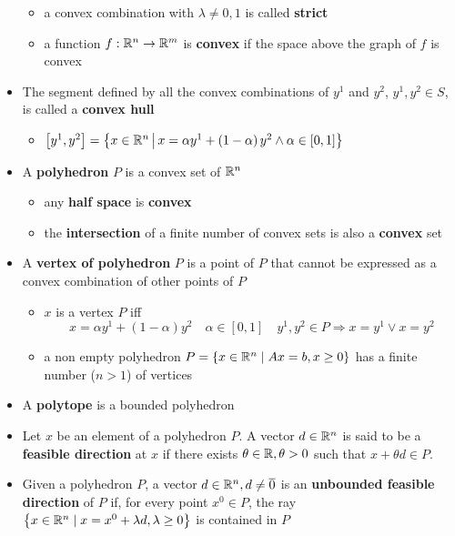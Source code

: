 \documentclass[english]{article}
\begin{document}
\begin{itemize}
\begin{itemize}[label=\(\rightarrow\)]
          \item a convex combination with \(\lambda \neq 0, 1\) is called \textbf{strict}
          \item a function \(f: \mathbb{R}^n \rightarrow \mathbb{R}^m\) is \textbf{convex} if the space above the graph of \(f\) is convex
        \end{itemize}
  \item The segment defined by all the convex combinations of \(y^1\) and \(y^2\), \(y^1, y^2 \in S\), is called a \textbf{convex hull}
        \begin{itemize}[label=\(\rightarrow\)]
          \item \(\left[ y^1, y^2 \right] = \left\{ x \in \mathbb{R}^n \,\middle\vert\,   x = \alpha y^1 + \left( 1-\alpha \right) y^2 \land \alpha \in \left[ 0, 1 \right] \right\}\)
        \end{itemize}
  \item A \textbf{polyhedron} \(P\) is a convex set of \(\mathbb{R}^n\)
        \begin{itemize}
          \item any \textbf{half space} is \textbf{convex}
          \item the \textbf{intersection} of a finite number of convex sets is also a \textbf{convex} set
        \end{itemize}
  \item A \textbf{vertex of polyhedron} \(P\) is a point of \(P\) that cannot be expressed as a convex combination of other points of \(P\)
        \begin{itemize}
          \item \(x\) is a vertex \(P\) iff
                \[ x = \alpha y^1 + (1 - \alpha) y^2 \quad \alpha \in \left[ 0, 1 \right] \quad y^1, y^2 \in P \Rightarrow x = y^1 \lor x = y^2 \]
          \item a non empty polyhedron \(P = \left\{ x \in \mathbb{R}^n \mid  Ax = b, x \geq 0 \right\}\) has a finite number (\(n >1\)) of vertices
        \end{itemize}
  \item A \textbf{polytope} is a bounded polyhedron
  \item Let \(x\) be an element of a polyhedron \(P\). A vector \(d \in \mathbb{R}^n\) is said to be a \textbf{feasible direction} at \(x\) if there exists \(\theta \in \mathbb{R}, \theta > 0\) such that \(x + \theta d \in P\).
  \item Given a polyhedron \(P\), a vector \(d \in \mathbb{R}^n, d \neq \overline{0}\) is an \textbf{unbounded feasible direction} of \(P\) if, for every point \(x^0 \in P\), the ray \(\left\{ x \in \mathbb{R}^n \mid   x = x^0 + \lambda d, \lambda \geq 0 \right\}\) is contained in \(P\)
\end{itemize}
\end{document}
